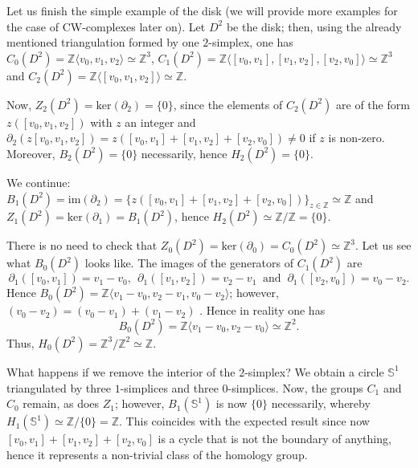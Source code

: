 \bigskip

Let us finish the simple example of the disk (we will provide more examples for the case of CW-complexes later on). Let $D^2$ be the disk; then, using the already mentioned triangulation formed by one $2$-simplex, one has $C_0(D^2) = \mathbb{Z}\langle v_0, v_1, v_2 \rangle \simeq \mathbb{Z}^3$, $C_1(D^2)=\mathbb{Z}\langle [v_0,v_1],[v_1,v_2],[v_2,v_0] \rangle \simeq \mathbb{Z}^3$ and $C_2(D^2)=\mathbb{Z}\langle [v_0,v_1,v_2] \rangle \simeq \mathbb{Z}$.

Now, $Z_2(D^2)= \text{ker}(\partial_2)=\{0\}$, since the elements of $C_2(D^2)$ are of the form $z([v_0,v_1,v_2])$ with $z$ an integer and $\partial_2(z[v_0,v_1,v_2]) = z([v_0,v_1]+[v_1,v_2]+[v_2,v_0]) \neq 0$ if $z$ is non-zero. Moreover, $B_2(D^2) =\{0\}$ necessarily, hence $H_2(D^2)=\{0\}$.

We continue: $B_1(D^2)=\text{im}(\partial_2)=\{z([v_0,v_1]+[v_1,v_2]+[v_2,v_0])\}_{z\in\mathbb{Z}}\simeq \mathbb{Z}$ and $Z_1(D^2)= \text{ker}(\partial_1)=B_1(D^2)$, hence $H_2(D^2)\simeq \mathbb{Z}/\mathbb{Z} = \{0\}$. %

There is no need to check that $Z_0(D^2)=\text{ker}(\partial_0)=C_0(D^2)\simeq \mathbb{Z}^3$. Let us see what $B_0(D^2)$ looks like. The images of the generators of $C_1(D^2)$ are
\begin{equation*}
    \partial_1([v_0,v_1]) = v_1 - v_0,~~ \partial_1([v_1,v_2]) = v_2 - v_1~\text{ and }~ \partial_1([v_2,v_0]) = v_0 - v_2.
\end{equation*}
Hence $B_0(D^2)=\mathbb{Z}\langle v_1 - v_0, v_2 - v_1, v_0 - v_2 \rangle$; however, $(v_0 - v_2) = (v_0 - v_1) + (v_1 - v_2)$ . Hence in reality one has
\begin{equation*}
    B_0(D^2)=\mathbb{Z}\langle v_1 - v_0, v_2 - v_0 \rangle \simeq \mathbb{Z}^2.
\end{equation*}
Thus, $H_0(D^2)=\mathbb{Z}^3/\mathbb{Z}^2\simeq \mathbb{Z}$.

What happens if we remove the interior of the $2$-simplex? We obtain a circle $\mathbb{S}^1$ triangulated by three $1$-simplices and three $0$-simplices. Now, the groups $C_1$ and $C_0$ remain, as does $Z_1$; however, $B_1(\mathbb{S}^1)$ is now $\{0\}$ necessarily, whereby $H_1(\mathbb{S}^1)\simeq\mathbb{Z}/\{0\} = \mathbb{Z}$. This coincides with the expected result since now $[v_0,v_1]+[v_1,v_2]+[v_2,v_0]$ is a cycle that is not the boundary of anything, hence it represents a non-trivial class of the homology group.


